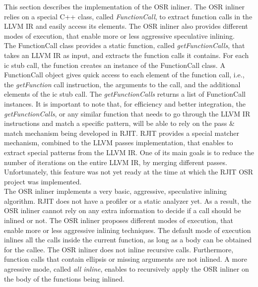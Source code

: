 This section describes the implementation of the OSR inliner.
The OSR inliner relies on a special C++ class, called \textit{FunctionCall}, to extract function calls in the LLVM IR and easily access its elements. 
The OSR inliner also provides different modes of execution, that enable more or less aggressive speculative inlining.\\

The FunctionCall class provides a static function, called \textit{getFunctionCalls}, that takes an LLVM IR as input, and extracts the function calls it contains.
For each ic stub call, the function creates an instance of the FunctionCall class. 
A FunctionCall object gives quick access to each element of the function call, i.e., the \textit{getFunction} call instruction, the arguments to the call, and the additional elements of the ic stub call.
The \textit{getFunctionCalls} returns a list of FunctionCall instances.
It is important to note that, for efficiency and better integration, the \textit{getFunctionCalls}, or any similar function that needs to go through the LLVM IR instructions and match a specific pattern, will be able to rely on the pass \& match mechanism being developed in RJIT.
RJIT provides a special matcher mechanism, combined to the LLVM passes implementation, that enables to extract special patterns from the LLVM IR.
One of its main goals is to reduce the number of iterations on the entire LLVM IR, by merging different passes.
Unfortunately, this feature was not yet ready at the time at which the RJIT OSR project was implemented.\\

The OSR inliner implements a very basic, aggressive, speculative inlining algorithm. 
RJIT does not have a profiler or a static analyzer yet.
As a result, the OSR inliner cannot rely on any extra information to decide if a call should be inlined or not.
The OSR inliner proposes different modes of execution, that enable more or less aggressive inlining techniques.
The default mode of execution inlines all the calls inside the current function, as long as a body can be obtained for the callee.
The OSR inliner does not inline recursive calls.
Furthermore, function calls that contain ellipsis or missing arguments are not inlined.
A more agressive mode, called \textit{all inline}, enables to recursively apply the OSR inliner on the body of the functions being inlined.
\\



